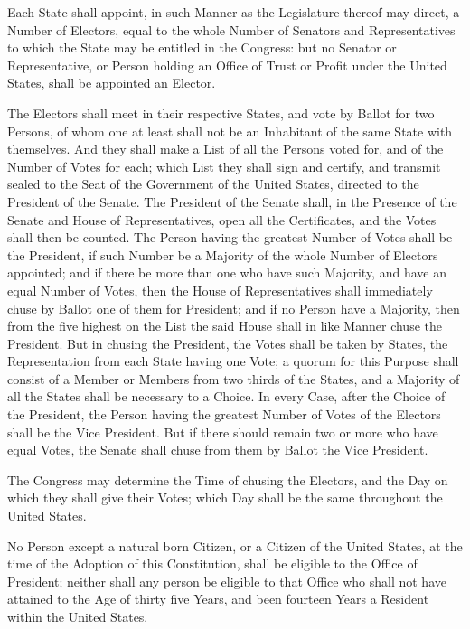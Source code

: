 \documentclass{article}
\begin{document}
Each State shall appoint, in such Manner as the Legislature thereof may direct,
a Number of Electors, equal to the whole Number of Senators and Representatives
to which the State may be entitled in the Congress: but no Senator or
Representative, or Person holding an Office of Trust or Profit under the United
States, shall be appointed an Elector.

The Electors shall meet in their respective States, and vote by Ballot for two
Persons, of whom one at least shall not be an Inhabitant of the same State with
themselves. And they shall make a List of all the Persons voted for, and of the
Number of Votes for each; which List they shall sign and certify, and transmit
sealed to the Seat of the Government of the United States, directed to the
President of the Senate. The President of the Senate shall, in the Presence of
the Senate and House of Representatives, open all the Certificates, and the
Votes shall then be counted. The Person having the greatest Number of Votes
shall be the President, if such Number be a Majority of the whole Number of
Electors appointed; and if there be more than one who have such Majority, and
have an equal Number of Votes, then the House of Representatives shall
immediately chuse by Ballot one of them for President; and if no Person have a
Majority, then from the five highest on the List the said House shall in like
Manner chuse the President. But in chusing the President, the Votes shall be
taken by States, the Representation from each State having one Vote; a quorum
for this Purpose shall consist of a Member or Members from two thirds of the
States, and a Majority of all the States shall be necessary to a Choice. In
every Case, after the Choice of the President, the Person having the greatest
Number of Votes of the Electors shall be the Vice President. But if there should
remain two or more who have equal Votes, the Senate shall chuse from them by
Ballot the Vice President.

The Congress may determine the Time of chusing the Electors, and the Day on
which they shall give their Votes; which Day shall be the same throughout the
United States.

No Person except a natural born Citizen, or a Citizen of the United States, at
the time of the Adoption of this Constitution, shall be eligible to the Office
of President; neither shall any person be eligible to that Office who shall not
have attained to the Age of thirty five Years, and been fourteen Years a
Resident within the United States.
\end{document}
